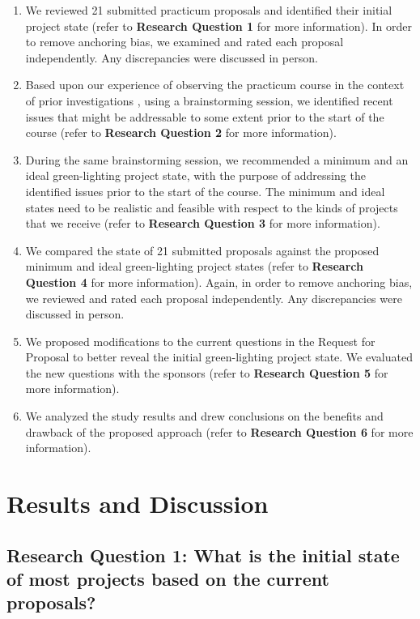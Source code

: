 \begin{enumerate}
\itemsep1pt\parskip0pt
\item
  We reviewed 21 submitted practicum proposals and
  identified their initial project state (refer to \textbf{Research Question
  1} for more information). In order to remove anchoring bias, we examined
  and rated each proposal independently. Any discrepancies were
  discussed in person.
\item
  Based upon our experience of observing the practicum course in the
  context of prior investigations \cite{EASE2014, ICSE2014},
  using a brainstorming session, we identified recent issues that
  might be addressable to some extent prior to the start of the course (refer to
  \textbf{Research Question 2} for more information).
\item
  During the same brainstorming session, we recommended a minimum and
  an ideal green-lighting project state, with the purpose of addressing
  the identified issues prior to the start of the course. The minimum
  and ideal states need to be realistic and feasible with respect to the
  kinds of projects that we receive (refer to \textbf{Research Question
  3} for more information).
\item
  We compared the state of 21 submitted proposals against the proposed
  minimum and ideal green-lighting project states (refer to \textbf{Research
  Question 4} for more information). Again, in order to remove
  anchoring bias, we reviewed and rated each proposal independently. Any
  discrepancies were discussed in person.
\item
  We proposed modifications to the current questions in the Request for
  Proposal to better reveal the initial green-lighting project state. We
  evaluated the new questions with the sponsors (refer to \textbf{Research
  Question 5} for more information).
\item
  We analyzed the study results and drew conclusions on the benefits
  and drawback of the proposed approach (refer to \textbf{Research Question 6
  } for more information).
\end{enumerate}

\section{Results and Discussion}
\label{Results}

\subsection{Research Question 1: What is the initial
state of most projects based on the current proposals?}

